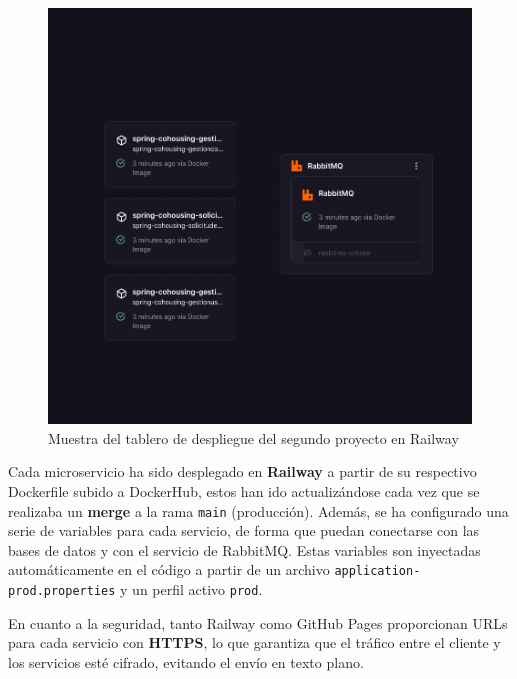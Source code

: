 \begin{figure}[H]
  \centering
  \includegraphics[width=1\textwidth]{fotos/railway2.png}
  \caption{Muestra del tablero de despliegue del segundo proyecto en Railway}
  \label{fig:railway2}
\end{figure}
Cada microservicio ha sido desplegado en \textbf{Railway} a partir de su respectivo Dockerfile subido a DockerHub, estos han ido actualizándose cada vez que se realizaba un \textbf{merge} a la rama \texttt{main} (producción). Además, se ha configurado una serie de variables para cada servicio, de forma que puedan conectarse con las bases de datos y con el servicio de RabbitMQ. Estas variables son inyectadas automáticamente en el código a partir de un archivo \texttt{application-prod.properties} y un perfil activo \texttt{prod}.

En cuanto a la seguridad, tanto Railway como GitHub Pages proporcionan URLs para cada servicio con \textbf{HTTPS}, lo que garantiza que el tráfico entre el cliente y los servicios esté cifrado, evitando el envío en texto plano.

